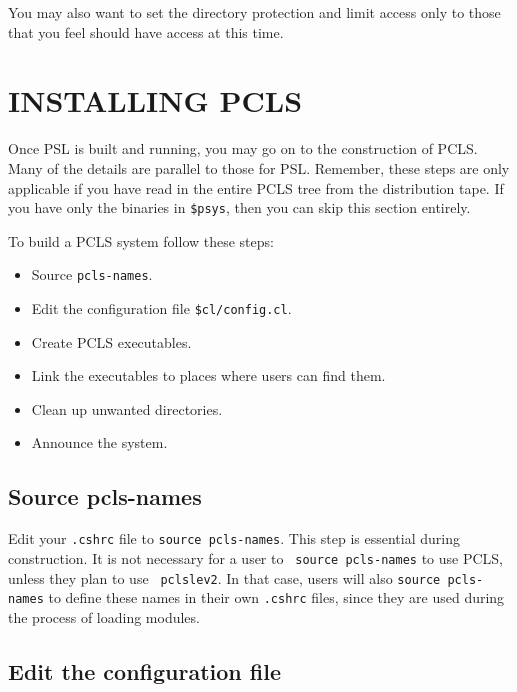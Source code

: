 You may also want to set the directory protection and limit access only to
those that you feel should have access at this time.

\section{INSTALLING PCLS}

Once PSL is built and running, you may go on to the construction of PCLS.
Many of the details are parallel to those for PSL. Remember, these
steps are only applicable if you have read in the entire PCLS tree
from the distribution tape. If you have only the binaries in {\tt \$psys},
then you can skip this section entirely.

To build a PCLS system follow these steps:

\begin{itemize}
\item Source {\tt pcls-names}.

\item Edit the configuration file {\tt \$cl/config.cl}.

\item Create PCLS executables.

\item Link the executables to places where users can find them.

\item Clean up unwanted directories.

\item Announce the system.

\end{itemize}

\subsection{Source pcls-names}

Edit your {\tt .cshrc} file to {\tt source pcls-names}.  This step is
essential during construction.  It is not necessary for a user to {\tt
source pcls-names} to use PCLS, unless they plan to use {\tt
pclslev2}.  In that case, users will also {\tt source pcls-names} to
define these names in their own {\tt .cshrc} files, since they are
used during the process of loading modules.

\subsection{Edit the configuration file}

